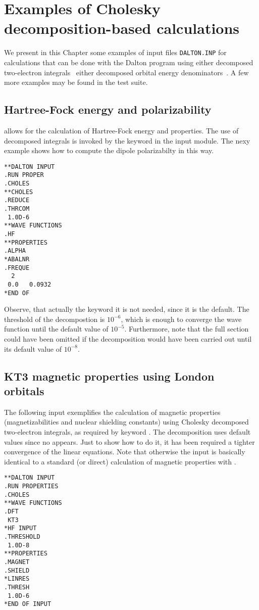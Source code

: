 \chapter{Examples of Cholesky decomposition-based calculations}
\label{ch:choexamples}

We present in this Chapter some examples of input files 
\verb|DALTON.INP| for calculations that can be done
with the Dalton program using either decomposed two-electron 
integrals~\cite{choint,chorsp} either decomposed orbital 
energy denominators~\cite{jcp_chopt,ijqc_chopt}.
A few more examples may be found in the test suite. 


\section{Hartree-Fock energy and polarizability}
%
{\choles}  allows for the calculation of Hartree-Fock energy
and properties. The use of decomposed integrals is invoked by 
the keyword  in the  input module. The
nexy example shows how to compute the dipole polarizabilty in this
way. 
%
\begin{verbatim}
**DALTON INPUT
.RUN PROPER
.CHOLES
**CHOLES
.REDUCE
.THRCOM
 1.0D-6
**WAVE FUNCTIONS
.HF
**PROPERTIES
.ALPHA
*ABALNR
.FREQUE
  2
 0.0   0.0932
*END OF
\end{verbatim}
Observe, that actually the keyword  it is not needed, since it is
the default. The threshold of the decompostion is $10^{-6}$, which is enough to 
converge the wave function until the default value of $10^{-5}$. Furthermore,
note that the full section  could have been omitted if the
decomposition would have been carried out until its default value of $10^{-8}$.

\section{KT3 magnetic properties using London orbitals}

The following input exemplifies the calculation of magnetic properties 
(magnetizabilities and nuclear shielding constants) using Cholesky
decomposed two-electron integrals, as required by keyword .
The decomposition uses default values since no  appears.
Just to show how to do it, it has been required a tighter convergence
of the linear equations.  Note that otherwise the input is basically identical 
to a standard (or direct) calculation of magnetic properties with {\dalton}.
\begin{verbatim}
**DALTON INPUT
.RUN PROPERTIES
.CHOLES
**WAVE FUNCTIONS
.DFT
 KT3
*HF INPUT
.THRESHOLD
 1.0D-8
**PROPERTIES
.MAGNET
.SHIELD
*LINRES
.THRESH
 1.0D-6
*END OF INPUT
\end{verbatim}


